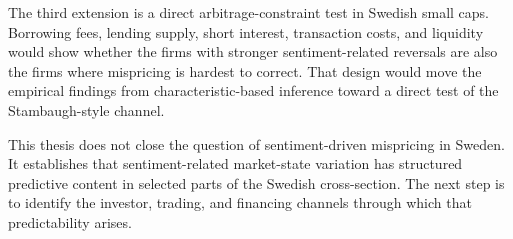 \documentclass[11pt]{article}
\begin{document}
The third extension is a direct arbitrage-constraint test in Swedish small caps. Borrowing fees, lending supply, short interest, transaction costs, and liquidity would show whether the firms with stronger sentiment-related reversals are also the firms where mispricing is hardest to correct. That design would move the empirical findings from characteristic-based inference toward a direct test of the Stambaugh-style channel.

This thesis does not close the question of sentiment-driven mispricing in Sweden. It establishes that sentiment-related market-state variation has structured predictive content in selected parts of the Swedish cross-section. The next step is to identify the investor, trading, and financing channels through which that predictability arises.

\clearpage
{}



\clearpage
\end{document}
